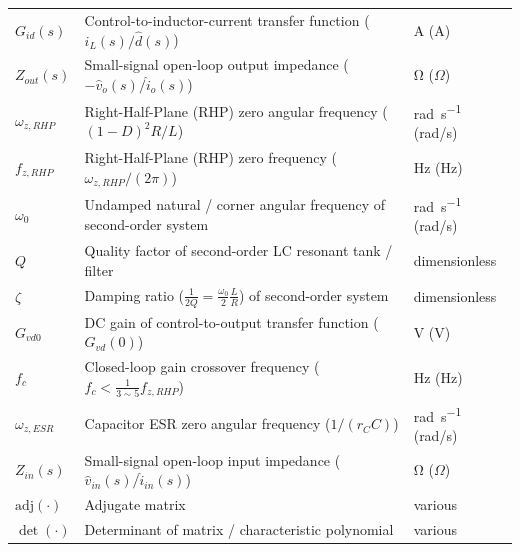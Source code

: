 \begin{center}
\begin{tabular}{@{}lll@{}}
$G_{id}(s)$ & Control-to-inductor-current transfer function ($\hat{i}_L(s)/\hat{d}(s)$) & \si{\ampere} (A) \\
$Z_{out}(s)$ & Small-signal open-loop output impedance ($-\hat{v}_o(s)/\hat{i}_o(s)$) & \si{\ohm} ($\Omega$) \\
$\omega_{z,RHP}$ & Right-Half-Plane (RHP) zero angular frequency ($(1-D)^2 R / L$) & \si{\radian\per\second} (rad/s) \\
$f_{z,RHP}$ & Right-Half-Plane (RHP) zero frequency ($\omega_{z,RHP}/(2\pi)$) & \si{\hertz} (Hz) \\
$\omega_0$ & Undamped natural / corner angular frequency of second-order system & \si{\radian\per\second} (rad/s) \\
$Q$ & Quality factor of second-order LC resonant tank / filter & dimensionless \\
$\zeta$ & Damping ratio ($\frac{1}{2Q} = \frac{\omega_0}{2} \frac{L}{R}$) of second-order system & dimensionless \\
$G_{vd0}$ & DC gain of control-to-output transfer function ($G_{vd}(0)$) & \si{\volt} (V) \\
$f_c$ & Closed-loop gain crossover frequency ($f_c < \frac{1}{3 \sim 5} f_{z,RHP}$) & \si{\hertz} (Hz) \\
$\omega_{z,ESR}$ & Capacitor ESR zero angular frequency ($1/(r_C C)$) & \si{\radian\per\second} (rad/s) \\
$Z_{in}(s)$ & Small-signal open-loop input impedance ($\hat{v}_{in}(s)/\hat{i}_{in}(s)$) & \si{\ohm} ($\Omega$) \\
$\text{adj}(\cdot)$ & Adjugate matrix & various \\
$\det(\cdot)$ & Determinant of matrix / characteristic polynomial & various \\
\bottomrule
\end{tabular}
\end{center}

